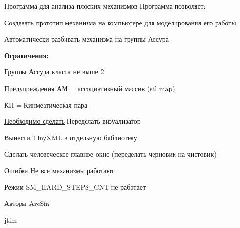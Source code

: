 Программа для анализа плоских механизмов Программа позволяет: 
\begin{DoxyItemize}
\item Создавать прототип механизма на компьютере для моделирования его работы 
\item Автоматически разбивать механизма на группы Ассура 
\end{DoxyItemize}{\bfseries Ограничения:} 
\begin{DoxyItemize}
\item Группы Ассура класса не выше 2 
\end{DoxyItemize}\begin{DoxyWarning}{Предупреждения}
АМ = ассоциативный массив (stl map) 

КП = Кинмеатическая пара
\end{DoxyWarning}
\begin{Desc}
\item[\hyperlink{todo__todo000001}{Необходимо сделать}]Переделать визуализатор 

Вынести TinyXML в отдельную библиотеку 

Сделать человеческое главное окно (переделать черновик на чистовик) \end{Desc}
\begin{Desc}
\item[\hyperlink{bug__bug000001}{Ошибка}]Не все механизмы работают 

Режим SM\_\-HARD\_\-STEPS\_\-CNT не работает\end{Desc}


\begin{DoxyAuthor}{Авторы}
ArcSin 

jtim 
\end{DoxyAuthor}
